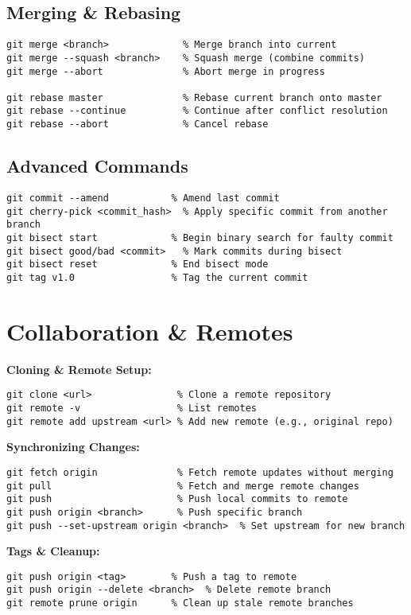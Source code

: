 \documentclass[a4paper,10pt]{article}
\begin{document}
\subsection{Merging \& Rebasing}
\begin{lstlisting}
git merge <branch>             % Merge branch into current
git merge --squash <branch>    % Squash merge (combine commits)
git merge --abort              % Abort merge in progress

git rebase master              % Rebase current branch onto master
git rebase --continue          % Continue after conflict resolution
git rebase --abort             % Cancel rebase
\end{lstlisting}

\subsection{Advanced Commands}
\begin{lstlisting}
git commit --amend           % Amend last commit
git cherry-pick <commit_hash>  % Apply specific commit from another branch
git bisect start             % Begin binary search for faulty commit
git bisect good/bad <commit>   % Mark commits during bisect
git bisect reset             % End bisect mode
git tag v1.0                 % Tag the current commit
\end{lstlisting}

\section{Collaboration \& Remotes}
\textbf{Cloning \& Remote Setup:}
\begin{lstlisting}
git clone <url>               % Clone a remote repository
git remote -v                 % List remotes
git remote add upstream <url> % Add new remote (e.g., original repo)
\end{lstlisting}

\textbf{Synchronizing Changes:}
\begin{lstlisting}
git fetch origin              % Fetch remote updates without merging
git pull                      % Fetch and merge remote changes
git push                      % Push local commits to remote
git push origin <branch>      % Push specific branch
git push --set-upstream origin <branch>  % Set upstream for new branch
\end{lstlisting}

\textbf{Tags \& Cleanup:}
\begin{lstlisting}
git push origin <tag>        % Push a tag to remote
git push origin --delete <branch>  % Delete remote branch
git remote prune origin      % Clean up stale remote branches
\end{lstlisting}
\end{document}
